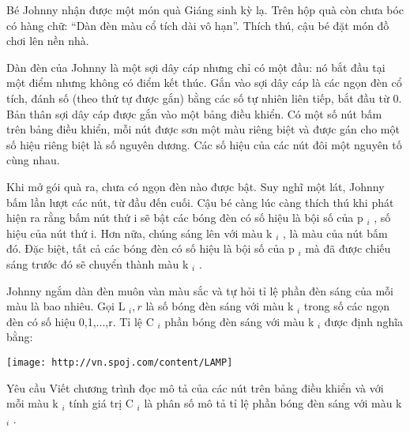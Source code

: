 Bé Johnny nhận được một món quà Giáng sinh kỳ lạ. Trên hộp quà còn chưa bóc có hàng chữ: “Dàn đèn màu cổ tích dài vô hạn”. Thích thú, cậu bé đặt món đồ chơi lên nền nhà.  

   Dàn đèn của Johnny là một sợi dây cáp nhưng chỉ có một đầu: nó bắt đầu tại một điểm nhưng không có điểm kết thúc. Gắn vào sợi dây cáp là các ngọn đèn cổ tích, đánh số (theo thứ tự được gắn) bằng các số tự nhiên liên tiếp, bắt đầu từ 0. Bản thân sợi dây cáp được gắn vào một bảng điều khiển. Có một số nút bấm trên bảng điều khiển, mỗi nút được sơn một màu riêng biệt và được gán cho một số hiệu  riêng biệt là số nguyên dương. Các số hiệu của các nút đôi một nguyên tố cùng nhau.  

   Khi mở gói quà ra, chưa có ngọn đèn nào được bật. Suy nghĩ một lát, Johnny bấm lần lượt các nút, từ đầu đến cuối. Cậu bé càng lúc càng thích thú khi phát hiện ra rằng bấm nút thứ i sẽ bật các bóng đèn có số hiệu là bội số của p   $_    i   $   , số hiệu của nút thứ i. Hơn nữa, chúng sáng lên với màu k   $_    i   $   , là màu của nút bấm đó. Đặc biệt, tất cả các bóng đèn có số hiệu là bội số của p   $_    i   $   mà đã được chiếu sáng trước đó sẽ chuyển thành màu k   $_    i   $   .  

   Johnny ngắm dàn đèn muôn vàn màu sắc và tự hỏi tỉ lệ phần đèn sáng của mỗi màu là bao nhiêu. Gọi L   $_    i,r   $   là số bóng đèn sáng với màu k   $_    i   $   trong số các ngọn đèn có số hiệu 0,1,...,r. Tỉ lệ C   $_    i   $   phần bóng đèn sáng với màu k   $_    i   $   được định nghĩa bằng:  


\texttt{[image: http://vn.spoj.com/content/LAMP]}

Yêu cầu
Viết chương trình đọc mô tả của các nút trên bảng điều khiển và với mỗi màu k   $_    i   $   tính giá trị C   $_    i   $   là phân số mô tả tỉ lệ phần bóng đèn sáng với màu k   $_    i   $   .